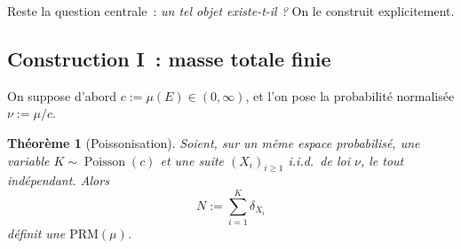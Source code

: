 \documentclass[11pt,a4paper]{article}
\theoremstyle{plain}
\newtheorem{theoreme}{Théorème}[section]
\theoremstyle{definition}
\newcommand{\Poi}{\operatorname{Poisson}}
\begin{document}
Reste la question centrale~: \emph{un tel objet existe-t-il ?} On le construit explicitement.

\subsection{Construction I~: masse totale finie}

On suppose d'abord $c:=\mu(E)\in(0,\infty)$, et l'on pose la probabilité normalisée $\nu:=\mu/c$.

\begin{theoreme}[Poissonisation]\label{thm:constrI}
Soient, sur un même espace probabilisé, une variable $K\sim\Poi(c)$ et une suite $(X_i)_{i\ge 1}$ i.i.d.\ de loi $\nu$, le tout indépendant. Alors
\[
N := \sum_{i=1}^{K}\delta_{X_i}
\]
définit une $\mathrm{PRM}(\mu)$.
\end{theoreme}
\end{document}
